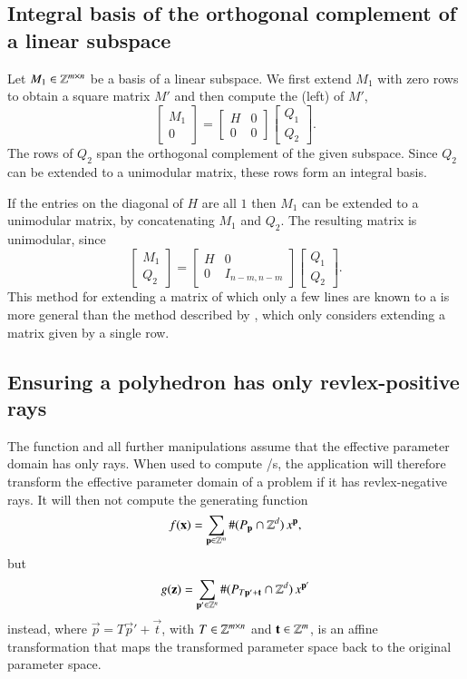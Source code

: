 \subsection{Integral basis of the orthogonal complement of a linear subspace}
\label{s:completion}

Let $M_1 \in \mathbb{Z}^{m \times n}$ be a basis of a linear subspace.
We first extend $M_1$ with zero rows to obtain a square matrix $M'$
and then compute the (left)  of $M'$,
$$
\begin{bmatrix}
M_1 \\ 0
\end{bmatrix}
=
\begin{bmatrix}
H & 0 \\ 0 & 0
\end{bmatrix}
\begin{bmatrix}
Q_1 \\ Q_2
\end{bmatrix}
.
$$
The rows of $Q_2$ span the orthogonal complement of the given subspace.
Since $Q_2$ can be extended to a unimodular matrix, these rows form
an integral basis.

If the entries on the diagonal of $H$ are all $1$ then $M_1$
can be extended to a unimodular matrix, by concatenating $M_1$ and $Q_2$.
The resulting matrix is unimodular, since
$$
\begin{bmatrix}
M_1 \\ Q_2
\end{bmatrix}
=
\begin{bmatrix}
H & 0 \\ 0 & I_{n-m,n-m}
\end{bmatrix}
\begin{bmatrix}
Q_1 \\ Q_2
\end{bmatrix}
.
$$
This method for extending a matrix of which
only a few lines are known to a 
is more general than the method described by ,
which only considers extending a matrix given by a single row.

\subsection{Ensuring a polyhedron has only revlex-positive rays}
\label{s:revlexpos}

The  function and all
further  manipulations assume that the effective
parameter domain has only  rays.
When used to compute \rgf/s, the 
application will therefore transform the effective parameter domain
of a problem if it has revlex-negative rays.
It will then not compute the generating function
$$
f(\vec x) = \sum_{\vec p \in \ZZ^m} \#(P_{\vec p} \cap \ZZ^d) \, x^{\vec p}
,
$$
but
$$
g(\vec z) = \sum_{\vec p' \in \ZZ^n}
		\#(P_{T \vec p' + \vec t} \cap \ZZ^d) \, x^{\vec p'}
$$
instead, where $\vec p = T \vec p' + \vec t$,
with $T \in \mathbb{Z}^{m \times n}$ and $\vec t \in \ZZ^m$, is an affine transformation
that maps the transformed parameter space back to the original parameter space.

